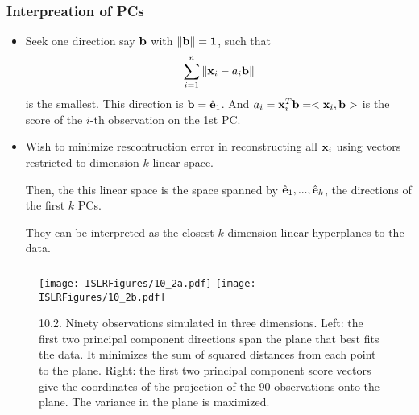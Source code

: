 \documentclass{beamer}
\def\bfb{{\bf b}}
\begin{document}
  
           \begin{frame}
           	\frametitle{Interpreation of PCs}
           	\begin{itemize}
           		
           		\item  Seek one direction say ${\bf b}$ with $\|\bf b\|=1$, such that
           		$$ \sum_{i=1}^n \| {\bf x}_{i} - a_i {\bf b}  \|$$
           		is the smallest. This direction is ${\bf b}  = \hat {\bf e}_1$. And $a_i = {\bf x}_i^T \bfb = <{\bf x}_i, \bfb>$
           		is the score of the $i$-th observation on the 1st PC. 
           		
           		\item  Wish to minimize rescontruction error
           		in reconstructing all 
           		 ${\bf x}_i$ using   vectors restricted to dimension $k$ linear space. 
           		 
           		 Then, the 
           		this linear space is the space spanned by $\hat {\bf e}_1, ..., \hat {\bf e}_k$, the directions of the
           		first $k$ PCs.  
           		
           	    They can be interpreted as the closest $k$ dimension linear hyperplanes to the data. 
           		
           	\end{itemize}
           \end{frame} 
            
   
         \begin{frame}
         	\frametitle{ }
         	\begin{figure}
         		\centering
         		\texttt{[image: ISLRFigures/10\_2a.pdf]}
         		 \texttt{[image: ISLRFigures/10\_2b.pdf]}
         		\caption{\scriptsize 10.2. Ninety observations simulated in three dimensions. Left: the
         			first two principal component directions span the plane that best fits the data. It
         			minimizes the sum of squared distances from each point to the plane. Right: the
         			first two principal component score vectors give the coordinates of the projection
         			of the 90 observations onto the plane. The variance in the plane is maximized.
         		}
         	\end{figure}
         \end{frame}
           
          
      
\end{document}
